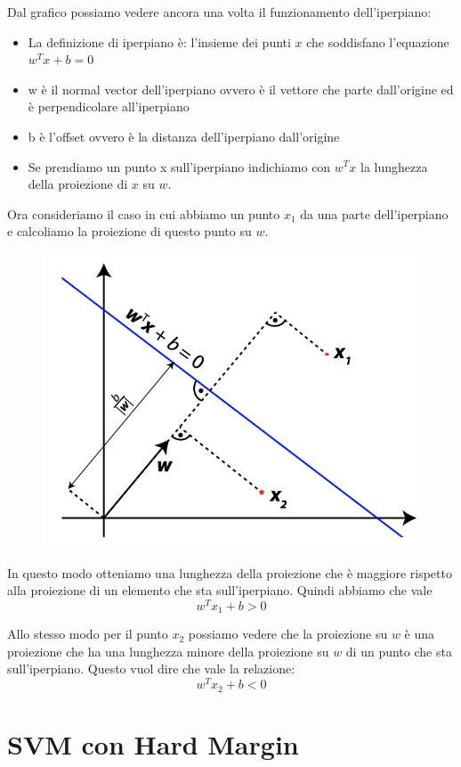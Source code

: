 \documentclass[14pt]{extreport}
\begin{document}
Dal grafico possiamo vedere ancora una volta il funzionamento dell'iperpiano:
\begin{itemize}
\item La definizione di iperpiano è: l'insieme dei punti $x$ che soddisfano l'equazione $w^Tx+b=0$
\item w è il normal vector dell'iperpiano ovvero è il vettore che parte dall'origine ed è perpendicolare all'iperpiano
\item b è l'offset ovvero è la distanza dell'iperpiano dall'origine
\item Se prendiamo un punto x sull'iperpiano indichiamo con $w^Tx$ la lunghezza della proiezione di $x$ su $w$.
\end{itemize}

Ora consideriamo il caso in cui abbiamo un punto $x_1$ da una parte dell'iperpiano e calcoliamo la proiezione di questo punto su $w$.

\begin{figure}[H]
\centering
\includegraphics[width=0.7\linewidth]{313.jpeg}
\end{figure}

 In questo modo otteniamo una lunghezza della proiezione che è maggiore rispetto alla proiezione di un elemento che sta sull'iperpiano. Quindi abbiamo
 che vale $$w^Tx_1+b > 0$$
 
 Allo stesso modo per il punto $x_2$ possiamo vedere che la proiezione su $w$ è una proiezione che ha una lunghezza minore della proiezione su $w$ di
 un punto che sta sull'iperpiano. Questo vuol dire che vale la relazione: $$w^Tx_2+b<0$$
 
 \section{SVM con Hard Margin}
\end{document}
